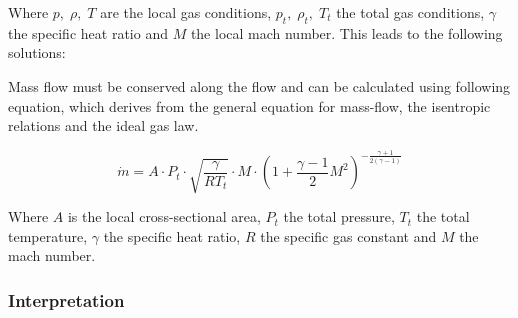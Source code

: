 Where $p,\; \rho,\; T$ are the local gas conditions, $p_t,\; \rho_t,\; T_t$ the total gas conditions, $\gamma$ the specific heat ratio and $M$ the local mach number.
This leads to the following solutions:

Mass flow must be conserved along the flow and can be calculated using following equation, which derives from the general equation for mass-flow, the isentropic relations and the ideal gas law.
\cite{benson_mass_nodate}

$$
	\dot{m} = A \cdot P_t \cdot \sqrt{\frac{\gamma}{R T_t}} \cdot M \cdot \left(1 + \frac{\gamma - 1}{2} M^2\right)^{-\frac{\gamma + 1}{2(\gamma - 1)}}
$$

Where $A$ is the local cross-sectional area, $P_t$ the total pressure, $T_t$ the total temperature, $\gamma$ the specific heat ratio, $R$ the specific gas constant and $M$ the mach number.
\cite{Cantwell_AA210A}

\subsubsection*{Interpretation}

